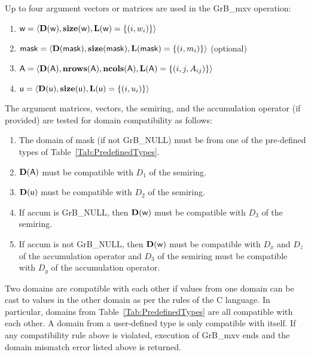 Up to four argument vectors or matrices are used in the {\sf GrB\_mxv} operation:
\begin{enumerate}
	\item ${\sf w} = \langle \bold{D}({\sf w}),\bold{size}({\sf w}),\bold{L}({\sf w}) = \{(i,w_i) \} \rangle$
	\item ${\sf mask} = \langle \bold{D}({\sf mask}),\bold{size}({\sf mask}),\bold{L}({\sf mask}) = \{(i,m_i) \} \rangle$ (optional)
	\item ${\sf A} = \langle \bold{D}({\sf A}),\bold{nrows}({\sf A}), \bold{ncols}({\sf A}),\bold{L}({\sf A}) = \{(i,j,A_{ij}) \} \rangle$
	\item ${\sf u} = \langle \bold{D}({\sf u}),\bold{size}({\sf u}),\bold{L}({\sf u}) = \{(i,u_i) \} \rangle$
\end{enumerate}

The argument matrices, vectors, the semiring, and the accumulation operator (if provided) 
are tested for domain compatibility as follows:
\begin{enumerate}
	\item The domain of {\sf mask} (if not {\sf GrB\_NULL}) must be from one of the pre-defined types of Table~\ref{Tab:PredefinedTypes}.

	\item $\bold{D}({\sf A})$ must be compatible with $D_1$ of the semiring.

	\item $\bold{D}({\sf u})$ must be compatible with $D_2$ of the semiring.

	\item If {\sf accum} is {\sf GrB\_NULL}, then $\bold{D}({\sf w})$ must be compatible with $D_3$ of the semiring.

	\item If {\sf accum} is not {\sf GrB\_NULL}, then $\bold{D}({\sf w})$ must be compatible with $D_x$ and $D_z$ of the 
	accumulation operator and $D_3$ of the semiring must be compatible with $D_y$ of the accumulation operator.
\end{enumerate}
Two domains are compatible with each other if values from one domain can be cast 
to values in the other domain as per the rules of the C language.
In particular, domains from Table~\ref{Tab:PredefinedTypes} are all compatible 
with each other. A domain from a user-defined type is only compatible with itself.
If any compatibility rule above is violated, execution of {\sf GrB\_mxv} ends and 
the domain mismatch error listed above is returned.


